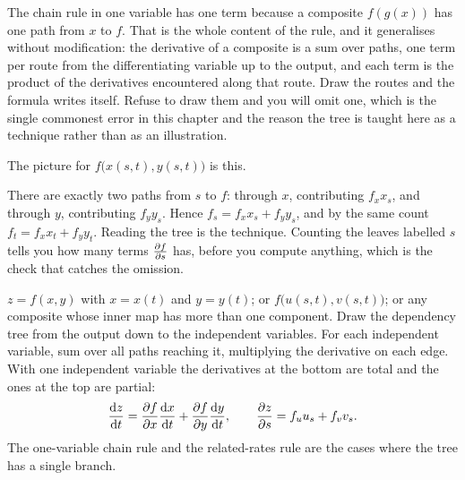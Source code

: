 The chain rule in one variable has one term because a composite $f(g(x))$ has one path from $x$ to $f$. That is the whole content of the rule, and it generalises without modification: the derivative of a composite is a sum over paths, one term per route from the differentiating variable up to the output, and each term is the product of the derivatives encountered along that route. Draw the routes and the formula writes itself. Refuse to draw them and you will omit one, which is the single commonest error in this chapter and the reason the tree is taught here as a technique rather than as an illustration.

The picture for $f\bigl(x(s,t),y(s,t)\bigr)$ is this.

\begin{center}
\end{center}

There are exactly two paths from $s$ to $f$: through $x$, contributing $f_{x}x_{s}$, and through $y$, contributing $f_{y}y_{s}$. Hence $f_{s}=f_{x}x_{s}+f_{y}y_{s}$, and by the same count $f_{t}=f_{x}x_{t}+f_{y}y_{t}$. Reading the tree is the technique. Counting the leaves labelled $s$ tells you how many terms $\frac{\partial f}{\partial s}$ has, before you compute anything, which is the check that catches the omission.

\cue $z=f(x,y)$ with $x=x(t)$ and $y=y(t)$; or $f\bigl(u(s,t),v(s,t)\bigr)$; or any composite whose inner map has more than one component.
\method Draw the dependency tree from the output down to the independent variables. For each independent variable, sum over all paths reaching it, multiplying the derivative on each edge. With one independent variable the derivatives at the bottom are total and the ones at the top are partial:
\[
\frac{\mathrm{d}z}{\mathrm{d}t}=\frac{\partial f}{\partial x}\frac{\mathrm{d}x}{\mathrm{d}t}+\frac{\partial f}{\partial y}\frac{\mathrm{d}y}{\mathrm{d}t},
\qquad
\frac{\partial z}{\partial s}=f_{u}u_{s}+f_{v}v_{s}.
\]
The one-variable chain rule and the related-rates rule are the cases where the tree has a single branch.

